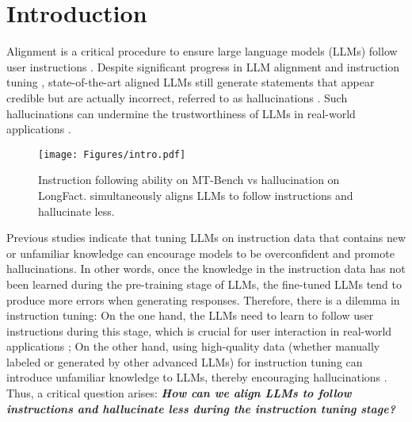 \section{Introduction}
\label{section:introduction}
Alignment is a critical procedure to ensure large language models (LLMs) follow user instructions \citep{ OpenAI2023GPT4TR, yang2024qwen2technicalreport}. 
Despite significant progress in LLM alignment and instruction tuning \citep{ouyang2022training, Bai2022TrainingAH}, state-of-the-art aligned LLMs still generate statements that appear credible but are actually incorrect, referred to as hallucinations \citep{ji-survey, hit-survey}.
Such hallucinations can undermine the trustworthiness of LLMs in real-world applications \citep{si2023spokenwoz, min2023factscore, rawte2023surveyhallucinationlargefoundation, wei2024long}.


\begin{figure}
    \centering
    \texttt{[image: Figures/intro.pdf]}
    \caption{Instruction following ability on MT-Bench vs hallucination on LongFact. \textbf{\OURS} simultaneously aligns LLMs to follow instructions and hallucinate less.}
    \label{fig_example}
\end{figure}

Previous studies \citep{kang2024unfamiliarfinetuningexamplescontrol, gekhman-etal-2024-fine, lin2024flame} indicate that tuning LLMs on instruction data that contains new or unfamiliar knowledge can encourage models to be overconfident and promote hallucinations. 
In other words, once the knowledge in the instruction data has not been learned during the pre-training stage of LLMs, the fine-tuned LLMs tend to produce more errors when generating responses.
Therefore, there is a dilemma in instruction tuning:
On the one hand, the LLMs need to learn to follow user instructions during this stage, which is crucial for user interaction in real-world applications \citep{wang2023how, chen2024alpagasus}; 
On the other hand, using high-quality data (whether manually labeled or generated by other advanced LLMs) for instruction tuning can introduce unfamiliar knowledge to LLMs, thereby encouraging hallucinations \citep{kang2024unfamiliarfinetuningexamplescontrol, lin2024flame}.
Thus, a critical question arises: \textit{\textbf{How can we align LLMs to follow instructions and hallucinate less during the instruction tuning stage?}}




